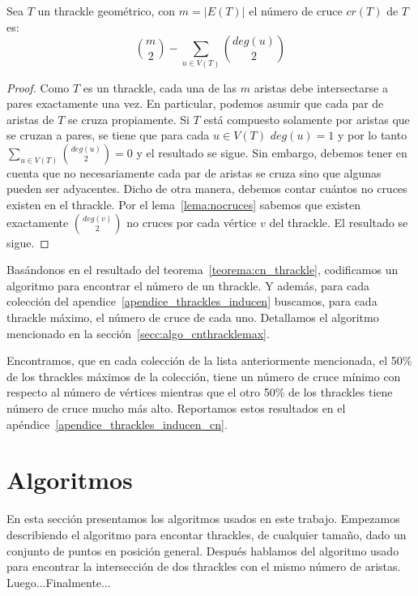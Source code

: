 \begin{theorem} \label{teorema:cn_thrackle}
  Sea $T$ un thrackle geométrico, con $m=|E({T})|$ el número de cruce $cr({T})$ de ${T}$ es:
  \[
    \binom{m}{2} - \sum_{u \in V({T})} \binom{deg(u)}{2}
  \]
\end{theorem}
\begin{proof}
  Como $T$ es un thrackle, cada una de las $m$ aristas debe intersectarse a pares
  exactamente una vez. En particular, podemos asumir que cada par de aristas de ${T}$ se
  cruza propiamente. Si ${T}$ está compuesto solamente por aristas que se cruzan a pares,
  se tiene que para cada $u\in V({T})$ $deg(u)=1$ y por lo tanto $\sum_{u \in V({T})}
  \binom{deg(u)}{2} = 0$ y el resultado se sigue. Sin embargo, debemos tener en cuenta
  que no necesariamente cada par de aristas se cruza sino que algunas pueden ser
  adyacentes. Dicho de otra manera, debemos contar cuántos no cruces existen en el
  thrackle. Por el lema~\ref{lema:nocruces} sabemos que existen exactamente
  $\binom{deg(v)}{2}$ no cruces por cada vértice $v$ del thrackle. El resultado se sigue.
\end{proof}

Basándonos en el resultado del teorema~\ref{teorema:cn_thrackle}, codificamos un
algoritmo para encontrar el número de un thrackle. Y además, para cada colección del
apendice~\ref{apendice_thrackles_inducen} buscamos, para cada thrackle máximo, el número
de cruce de cada uno. Detallamos el algoritmo mencionado en la
sección~\ref{secc:algo_cnthracklemax}.

Encontramos, que en cada colección de la lista anteriormente mencionada, el 50\% de los
thrackles máximos de la colección, tiene un número de cruce mínimo con respecto al número
de vértices mientras que el otro 50\% de los thrackles tiene número de cruce mucho más
alto. Reportamos estos resultados en el apéndice~\ref{apendice_thrackles_inducen_cn}.


\section{Algoritmos}\label{seccion_algoritmos}
En esta sección presentamos los algoritmos usados en este trabajo. Empezamos
describiendo el algoritmo para encontar thrackles, de cualquier tamaño, dado
un conjunto de puntos en posición general. Después hablamos del algoritmo
usado para encontrar la intersección de dos thrackles con el mismo número de
aristas. Luego...Finalmente...

